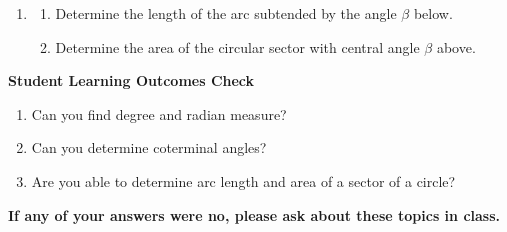 \begin{enumerate}
\item \begin{enumerate}
\item Determine the length of the arc subtended by the angle $\beta$ below. \\
 \vfill
\item Determine the area of the circular sector with central angle $\beta$ above. 
\end{enumerate}


\vfill









\end{enumerate}

\noindent \textbf{Student Learning Outcomes Check}

\begin{enumerate}
\item Can you find degree and radian measure?
\item Can you determine coterminal angles?
\item Are you able to determine arc length and area of a sector of a circle?
\end{enumerate}

\noindent \textbf{If any of your answers were no, please ask about these topics in class.}

